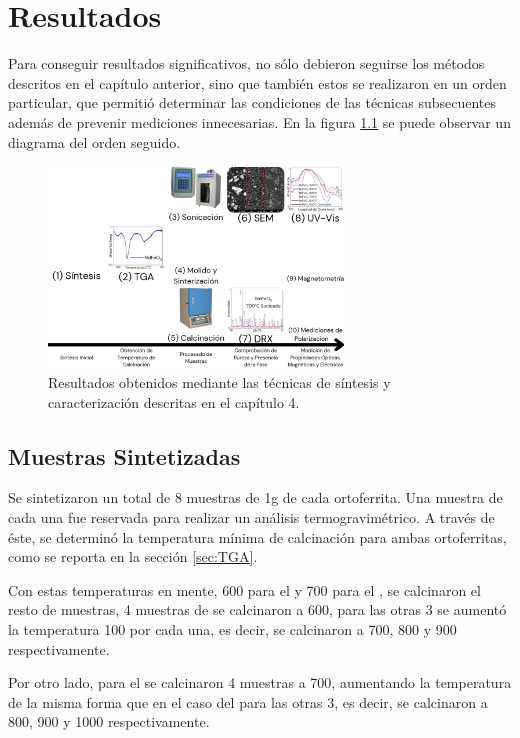 \documentclass[../main.tex]{subfiles}
\begin{document}
\chapter{Resultados}
Para conseguir resultados significativos, no sólo debieron seguirse los métodos descritos en el capítulo anterior, sino que también estos se realizaron en un orden particular, que permitió determinar las condiciones de las técnicas subsecuentes además de prevenir mediciones innecesarias. En la figura \ref{fig:resdiag} se puede observar un diagrama del orden seguido.
\begin{figure}[H]
    \centering
    \includegraphics[width=0.7\textwidth]{fig/diagresultados.png}
    \caption{Resultados obtenidos mediante las técnicas de síntesis y caracterización descritas en el capítulo 4.}
    \label{fig:resdiag}
\end{figure}
\section{Muestras Sintetizadas} \label{sec:sintesis}
Se sintetizaron un total de 8 muestras de 1g de cada ortoferrita. Una muestra de cada una fue reservada para realizar un análisis termogravimétrico. A través de éste, se determinó la temperatura mínima de calcinación para ambas ortoferritas, como se reporta en la sección \ref{sec:TGA}.

Con estas temperaturas en mente, 600\gradoC{} para el \neod{} y 700\gradoC{} para el \sama{}, se calcinaron el resto de muestras, 4 muestras de \neod{} se calcinaron a 600\gradoC{}, para las otras 3 se aumentó la temperatura 100\gradoC{} por cada una, es decir, se calcinaron a 700, 800 y 900\gradoC{} respectivamente.

Por otro lado, para el \sama{} se calcinaron 4 muestras a 700\gradoC{}, aumentando la temperatura de la misma forma que en el caso del \neod{} para las otras 3, es decir, se calcinaron a 800, 900 y 1000\gradoC{} respectivamente.
\end{document}
